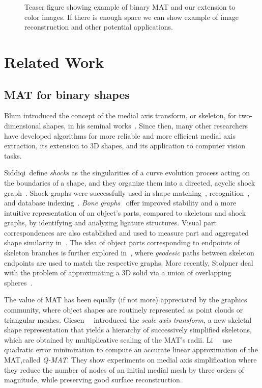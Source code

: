 \documentclass[10pt,twocolumn,letterpaper]{article}
\begin{document}
\begin{figure}[!t]
\caption{Teaser figure showing example of binary MAT and our extension to color images.
If there is enough space we can show example of image reconstruction and other potential applications.}
\label{fig:teaser}
\end{figure}

\section{Related Work}\label{sec:related}
\subsection{MAT for binary shapes}
Blum introduced the concept of the medial axis transform, or skeleton, for two-dimensional shapes,
in  his seminal works~\cite{blum1967transformation,blum1973biological}.
Since then, many other researchers have developed algorithms for more reliable
and more efficient medial axis extraction, its extension to 3D shapes, and its application
to computer vision tasks.

Siddiqi~\etal define \emph{shocks} as the singularities of a curve evolution process acting on the boundaries of
a shape, and they organize them into a directed, acyclic shock graph~\cite{siddiqi1999shock}.
Shock graphs were successfully used in shape matching~\cite{siddiqi1999shock}, recognition~\cite{sebastian2001recognition},
and database indexing~\cite{sebastian2002shock}.
\emph{Bone graphs}~\cite{macrini2008skeletons} offer improved stability and a more intuitive representation of an object's parts, 
compared to skeletons and shock graphs, by identifying and analyzing ligature structures.
Visual part correspondences are also established and used to measure part and aggregated shape similarity in~\cite{latecki2000shape}.
The idea of object parts corresponding to endpoints of skeleton branches is further explored in~\cite{bai2008path}, where
\emph{geodesic} paths between skeleton endpoints are used to match the respective graphs.
More recently, Stolpner \etal deal with the problem of approximating a 3D solid via a union
of overlapping spheres~\cite{stolpner2012medial}.


The value of MAT has been equally (if not more) appreciated by the graphics community, where object shapes 
are routinely represented as point clouds or triangular meshes.
Giesen~\etal~\cite{giesen2009scale} introduced the \emph{scale axis transform}, a new skeletal shape representation
that yields a hierarchy of successively simplified skeletons, which are obtained by multiplicative scaling of the
MAT's radii.
Li~\etal~\cite{li2015q} use quadratic error minimization to compute an accurate linear approximation of the MAT,called \emph{Q-MAT}.
They show experiments on medial axis simplification where they reduce the number of nodes of an initial medial mesh
by three orders of magnitude, while preserving good surface reconstruction.
\end{document}
